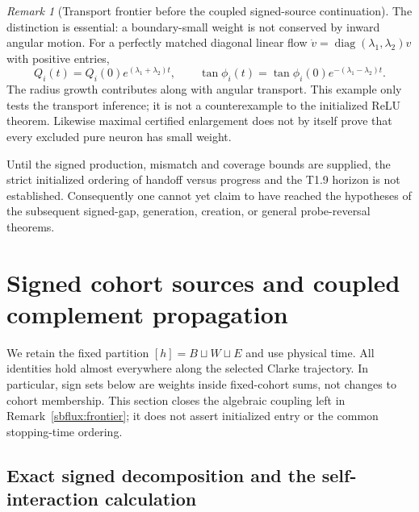 \documentclass{article} %
\theoremstyle{plain}
\theoremstyle{definition}
\theoremstyle{remark}
\newtheorem{remark}[theorem]{Remark}
\begin{document}
\begin{remark}[Transport frontier before the coupled signed-source continuation]
The distinction is essential: a boundary-small weight is not conserved
by inward angular motion. For a perfectly matched diagonal linear flow
$\dot v=\operatorname{diag}(\lambda_1,\lambda_2)v$ with positive entries,
\[
 Q_i(t)=Q_i(0)e^{(\lambda_1+\lambda_2)t},\qquad
 \tan\phi_i(t)=\tan\phi_i(0)e^{-(\lambda_1-\lambda_2)t}.
\]
The radius growth contributes along with angular transport. This example
only tests the transport inference; it is not a counterexample to the
initialized ReLU theorem. Likewise maximal certified enlargement does not
by itself prove that every excluded pure neuron has small weight.

Until the signed production, mismatch and coverage bounds are supplied,
the strict initialized ordering of handoff versus progress and the T1.9
horizon is not established. Consequently one cannot yet claim to have
reached the hypotheses of the subsequent signed-gap, generation, creation,
or general probe-reversal theorems.
\end{remark}

\section{Signed cohort sources and coupled complement propagation}
\label{sbcouple:scope}

We retain the fixed partition $[h]=B\sqcup W\sqcup E$ and use physical
time. All identities hold almost everywhere along the selected Clarke
trajectory. In particular, sign sets below are weights inside fixed-cohort
sums, not changes to cohort membership. This section closes the algebraic
coupling left in Remark~\ref{sbflux:frontier}; it does not assert initialized
entry or the common stopping-time ordering.

\subsection{Exact signed decomposition and the self-interaction calculation}
\end{document}
